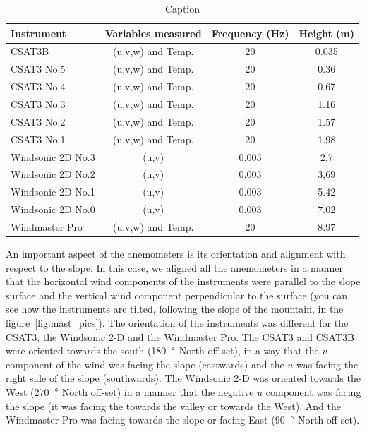\begin{table}[!ht]
    \centering
    \begin{tabular}{ | l | c | c | c |}
    \hline
    \textbf{Instrument} & \textbf{Variables measured} &  \textbf{Frequency (Hz)} & \textbf{Height (m)} \\ [0.5ex]  \hline\hline
    CSAT3B & (u,v,w) and Temp. & 20 & 0.035 \\
    \hline
    CSAT3 No.5 & (u,v,w) and Temp. & 20 & 0.36 \\
    \hline
    CSAT3 No.4 & (u,v,w) and Temp. & 20 & 0.67 \\
    \hline
    CSAT3 No.3 & (u,v,w) and Temp. & 20 & 1.16 \\
    \hline
    CSAT3 No.2 & (u,v,w) and Temp. & 20 & 1.57 \\
    \hline
    CSAT3 No.1 & (u,v,w) and Temp. & 20 & 1.98 \\
    \hline
    Windsonic 2D No.3 & (u,v) & 0.003 &  2.7\\
    \hline
    Windsonic 2D No.2 & (u,v) & 0.003 &  3,69\\
    \hline
    Windsonic 2D No.1 & (u,v) & 0.003 &  5.42\\
    \hline
    Windsonic 2D No.0 & (u,v) & 0.003 &  7.02\\
    \hline
    Windmaster Pro & (u,v,w) and Temp. & 20 & 8.97 \\
    \hline
    
    \end{tabular}
    \caption{Caption}
    \label{tab:intruments_anemometers}
\end{table}

An important aspect of the anemometers is its orientation and alignment with respect to the slope. In this case, we aligned all the anemometers in a manner that the horizontal wind components of the instruments were parallel to the slope surface and the vertical wind component perpendicular to the surface (you can see how the instruments are tilted, following the slope of the mountain, in the figure~\ref{fig:mast_pics}). The orientation of the instruments was different for the CSAT3, the Windsonic 2-D and the Windmaster Pro. The CSAT3 and CSAT3B were oriented towards the south (180~$\degree$ North off-set), in a way that the $v$ component of the wind was facing the slope (eastwards) and the $u$ was facing the right side of the slope (southwards). The Windsonic 2-D was oriented towards the West (270~$\degree$ North off-set) in a manner that the negative $u$ component was facing the slope (it was facing the towards the valley or towards the West). And the Windmaster Pro was facing towards the slope or facing East (90~$\degree$ North off-set).

